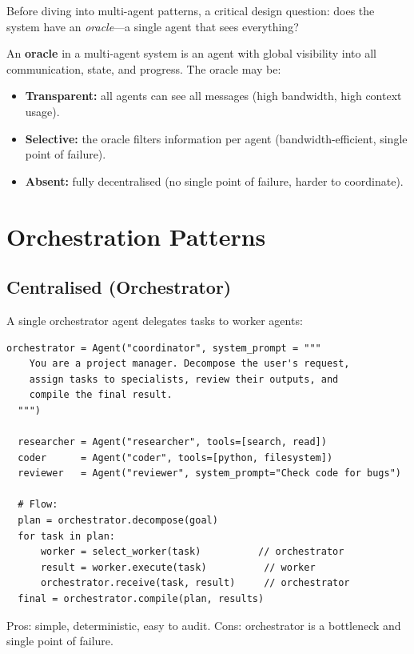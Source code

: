 Before diving into multi-agent patterns, a critical design question: does the system have an \emph{oracle}---a single agent that sees everything?

\begin{definition}[Oracle]
	An \textbf{oracle} in a multi-agent system is an agent with global visibility into all communication, state, and progress. The oracle may be:
	\begin{itemize}
		\item \textbf{Transparent:} all agents can see all messages (high bandwidth, high context usage).
		\item \textbf{Selective:} the oracle filters information per agent (bandwidth-efficient, single point of failure).
		\item \textbf{Absent:} fully decentralised (no single point of failure, harder to coordinate).
	\end{itemize}
\end{definition}

\section{Orchestration Patterns}

\subsection{Centralised (Orchestrator)}

A single orchestrator agent delegates tasks to worker agents:

\begin{lstlisting}[caption=Orchestrator pattern]
  orchestrator = Agent("coordinator", system_prompt = """
    You are a project manager. Decompose the user's request,
    assign tasks to specialists, review their outputs, and
    compile the final result.
  """)

  researcher = Agent("researcher", tools=[search, read])
  coder      = Agent("coder", tools=[python, filesystem])
  reviewer   = Agent("reviewer", system_prompt="Check code for bugs")

  # Flow:
  plan = orchestrator.decompose(goal)
  for task in plan:
      worker = select_worker(task)          // orchestrator
      result = worker.execute(task)          // worker
      orchestrator.receive(task, result)     // orchestrator
  final = orchestrator.compile(plan, results)
\end{lstlisting}

Pros: simple, deterministic, easy to audit. Cons: orchestrator is a bottleneck and single point of failure.

